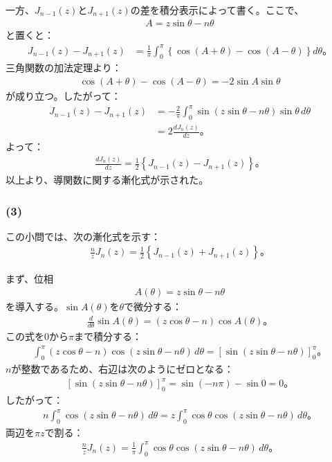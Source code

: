 \documentclass[platex,dvipdfmx,a4paper]{jsarticle}
\newcommand{\bbn}[2]{\frac{d #1}{d #2}}
\begin{document}
  一方、$J_{n-1}(z)$と$J_{n+1}(z)$の差を積分表示によって書く。ここで、
  \begin{align*}
    A=z\sin\theta-n\theta
  \end{align*}
  と置くと：
  \begin{align*}
    J_{n-1}(z)-J_{n+1}(z)
    &=\frac{1}{\pi}\int_0^\pi
    \left\{\cos(A+\theta)-\cos(A-\theta)\right\}d\theta。
  \end{align*}
  三角関数の加法定理より：
  \begin{align*}
    \cos(A+\theta)-\cos(A-\theta)
    =-2\sin A\sin\theta
  \end{align*}
  が成り立つ。したがって：
  \begin{align*}
    J_{n-1}(z)-J_{n+1}(z)
    &=-\frac{2}{\pi}\int_0^\pi
    \sin(z\sin\theta-n\theta)\sin\theta\,d\theta\\
    &=2\bbn{J_n(z)}{z}。
  \end{align*}
  よって：
  \begin{align*}
    \bbn{J_n(z)}{z}
    =\frac{1}{2}\left\{J_{n-1}(z)-J_{n+1}(z)\right\}。
  \end{align*}
  以上より、導関数に関する漸化式が示された。

  \subsubsection*{(3)}

  この小問では、次の漸化式を示す：
  \begin{align*}
    \frac{n}{z}J_n(z)
    =\frac{1}{2}\left\{J_{n-1}(z)+J_{n+1}(z)\right\}。
  \end{align*}

  まず、位相
  \begin{align*}
    A(\theta)=z\sin\theta-n\theta
  \end{align*}
  を導入する。$\sin A(\theta)$を$\theta$で微分する：
  \begin{align*}
    \bbn{}{\theta}\sin A(\theta)
    =\left(z\cos\theta-n\right)\cos A(\theta)。
  \end{align*}
  この式を$0$から$\pi$まで積分する：
  \begin{align*}
    \int_0^\pi
    \left(z\cos\theta-n\right)
    \cos(z\sin\theta-n\theta)\,d\theta
    =
    \left[\sin(z\sin\theta-n\theta)\right]_0^\pi。
  \end{align*}
  $n$が整数であるため、右辺は次のようにゼロとなる：
  \begin{align*}
    \left[\sin(z\sin\theta-n\theta)\right]_0^\pi
    =\sin(-n\pi)-\sin0
    =0。
  \end{align*}
  したがって：
  \begin{align*}
    n\int_0^\pi\cos(z\sin\theta-n\theta)\,d\theta
    =
    z\int_0^\pi
    \cos\theta\cos(z\sin\theta-n\theta)\,d\theta。
  \end{align*}
  両辺を$\pi z$で割る：
  \begin{align*}
    \frac{n}{z}J_n(z)
    =
    \frac{1}{\pi}\int_0^\pi
    \cos\theta\cos(z\sin\theta-n\theta)\,d\theta。
  \end{align*}
\end{document}
